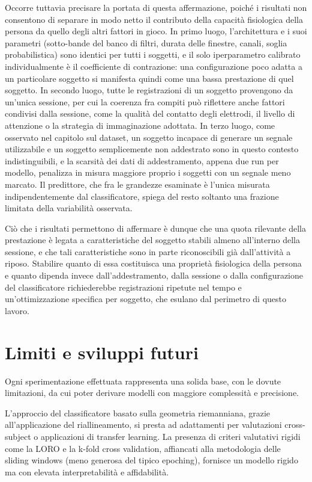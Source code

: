 Occorre tuttavia precisare la portata di questa affermazione, poiché i risultati non consentono di separare in modo netto il contributo della capacità fisiologica della persona da quello degli altri fattori in gioco. In primo luogo, l'architettura e i suoi parametri (sotto-bande del banco di filtri, durata delle finestre, canali, soglia probabilistica) sono identici per tutti i soggetti, e il solo iperparametro calibrato individualmente è il coefficiente di contrazione: una configurazione poco adatta a un particolare soggetto si manifesta quindi come una bassa prestazione di quel soggetto. In secondo luogo, tutte le registrazioni di un soggetto provengono da un'unica sessione, per cui la coerenza fra compiti può riflettere anche fattori condivisi dalla sessione, come la qualità del contatto degli elettrodi, il livello di attenzione o la strategia di immaginazione adottata. In terzo luogo, come osservato nel capitolo sul dataset, un soggetto incapace di generare un segnale utilizzabile e un soggetto semplicemente non addestrato sono in questo contesto indistinguibili, e la scarsità dei dati di addestramento, appena due run per modello, penalizza in misura maggiore proprio i soggetti con un segnale meno marcato. Il predittore, che fra le grandezze esaminate è l'unica misurata indipendentemente dal classificatore, spiega del resto soltanto una frazione limitata della variabilità osservata.

Ciò che i risultati permettono di affermare è dunque che una quota rilevante della prestazione è legata a caratteristiche del soggetto stabili almeno all'interno della sessione, e che tali caratteristiche sono in parte riconoscibili già dall'attività a riposo. Stabilire quanto di essa costituisca una proprietà fisiologica della persona e quanto dipenda invece dall'addestramento, dalla sessione o dalla configurazione del classificatore richiederebbe registrazioni ripetute nel tempo e un'ottimizzazione specifica per soggetto, che esulano dal perimetro di questo lavoro.


\section{Limiti e sviluppi futuri}
Ogni sperimentazione effettuata rappresenta una solida base, con le dovute limitazioni, da cui poter derivare modelli con maggiore complessità e precisione. 

L'approccio del classificatore basato sulla geometria riemanniana, grazie all'applicazione del riallineamento, si presta ad adattamenti per valutazioni cross-subject o applicazioni di transfer learning. La presenza di criteri valutativi rigidi come la LORO e la k-fold cross validation, affiancati alla metodologia delle sliding windows (meno generosa del tipico epoching), fornisce un modello rigido ma con elevata interpretabilità e affidabilità.

